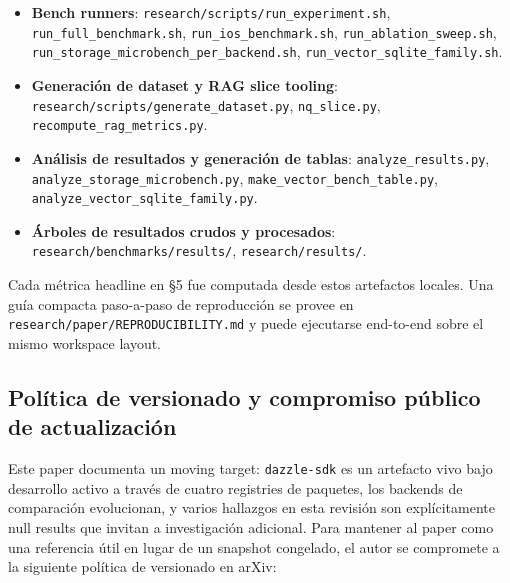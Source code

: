 \begin{itemize}
\tightlist
\item
  \textbf{Bench runners}: \texttt{research/scripts/run\_experiment.sh},
  \texttt{run\_full\_benchmark.sh}, \texttt{run\_ios\_benchmark.sh},
  \texttt{run\_ablation\_sweep.sh},
  \texttt{run\_storage\_microbench\_per\_backend.sh},
  \texttt{run\_vector\_sqlite\_family.sh}.
\item
  \textbf{Generación de dataset y RAG slice tooling}:
  \texttt{research/scripts/generate\_dataset.py}, \texttt{nq\_slice.py},
  \texttt{recompute\_rag\_metrics.py}.
\item
  \textbf{Análisis de resultados y generación de tablas}:
  \texttt{analyze\_results.py}, \texttt{analyze\_storage\_microbench.py},
  \texttt{make\_vector\_bench\_table.py},
  \texttt{analyze\_vector\_sqlite\_family.py}.
\item
  \textbf{Árboles de resultados crudos y procesados}:
  \texttt{research/benchmarks/results/}, \texttt{research/results/}.
\end{itemize}

Cada métrica headline en §5 fue computada desde estos artefactos locales. Una
guía compacta paso-a-paso de reproducción se provee en
\texttt{research/paper/REPRODUCIBILITY.md} y puede ejecutarse end-to-end sobre
el mismo workspace layout.

\subsection{Política de versionado y compromiso público de
actualización}\label{poluxedtica-de-versionado-y-compromiso-puxfablico-de-actualizaciuxf3n}

Este paper documenta un moving target: \texttt{dazzle-sdk} es un artefacto vivo
bajo desarrollo activo a través de cuatro registries de paquetes, los backends
de comparación evolucionan, y varios hallazgos en esta revisión son
explícitamente null results que invitan a investigación adicional. Para mantener
al paper como una referencia útil en lugar de un snapshot congelado, el autor se
compromete a la siguiente política de versionado en arXiv:

